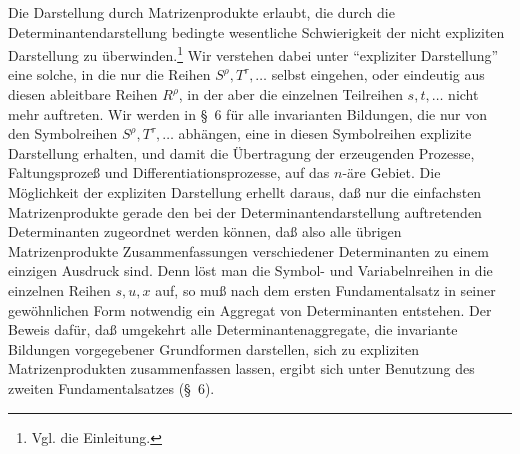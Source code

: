 Die Darstellung durch Matrizenprodukte erlaubt, die durch die Determinantendarstellung bedingte wesentliche Schwierigkeit der nicht expliziten Darstellung zu überwinden.\footnote{Vgl. die Einleitung.} Wir verstehen dabei unter ``expliziter Darstellung'' eine solche, in die nur die Reihen $S^\rho,T^\tau,\ldots$ selbst eingehen, oder eindeutig aus diesen ableitbare Reihen $R^\rho$, in der aber die einzelnen Teilreihen $s,t,\ldots$ nicht mehr auftreten. Wir werden in \S\ 6 für alle invarianten Bildungen, die nur von den Symbolreihen $S^\rho,T^\tau,\ldots$ abhängen, eine in diesen Symbolreihen explizite Darstellung erhalten, und damit die Übertragung der erzeugenden Prozesse, Faltungsprozeß und Differentiationsprozesse, auf das $n$-äre Gebiet. Die Möglichkeit der expliziten Darstellung erhellt daraus, daß nur die einfachsten Matrizenprodukte gerade den bei der Determinantendarstellung auftretenden Determinanten zugeordnet werden können, daß also alle übrigen Matrizenprodukte Zusammenfassungen verschiedener Determinanten zu einem einzigen Ausdruck sind. Denn löst man die Symbol- und Variabelnreihen in die einzelnen Reihen $s,u,x$ auf, so muß nach dem ersten Fundamentalsatz in seiner gewöhnlichen Form notwendig ein Aggregat von Determinanten entstehen. Der Beweis dafür, daß umgekehrt alle Determinantenaggregate, die invariante Bildungen vorgegebener Grundformen darstellen, sich zu expliziten Matrizenprodukten zusammenfassen lassen, ergibt sich unter Benutzung des zweiten Fundamentalsatzes (\S\ 6).
